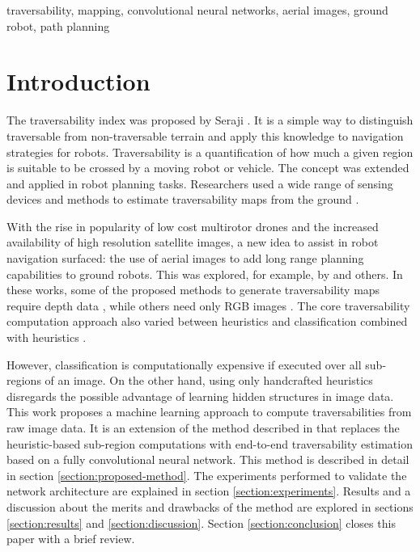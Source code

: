 \documentclass[conference]{IEEEtran}
\begin{document}
\begin{IEEEkeywords}
traversability, mapping, convolutional neural networks, aerial images, ground robot, path planning
\end{IEEEkeywords}

\section{Introduction}

The traversability index was proposed by Seraji \cite{seraji:1999}.
It is a simple way to distinguish traversable from non-traversable terrain and apply this knowledge to navigation strategies for robots.
Traversability is a quantification of how much a given region is suitable to be crossed by a moving robot or vehicle.
The concept was extended and applied in robot planning tasks.
Researchers used a wide range of sensing devices and methods to estimate traversability maps from the ground \cite{howard:2001,howard:2003,castejon:2005,guo:2008,shneier:2008}.

With the rise in popularity of low cost multirotor drones and the increased availability of high resolution satellite images, a new idea to assist in robot navigation surfaced: the use of aerial images to add long range planning capabilities to ground robots.
This was explored, for example, by \cite{vandapel:2006,hudjakov:2011,hudjakov:2013,delmerico:2017,borges:2019} and others.
In these works, some of the proposed methods to generate traversability maps require depth data \cite{vandapel:2006,delmerico:2017}, while others need only RGB images \cite{hudjakov:2011,hudjakov:2013,borges:2019}.
The core traversability computation approach also varied between heuristics \cite{vandapel:2006,borges:2019} and classification combined with heuristics \cite{hudjakov:2011,hudjakov:2013,delmerico:2017}.

However, classification is computationally expensive if executed over all sub-regions of an image.
On the other hand, using only handcrafted heuristics disregards the possible advantage of learning hidden structures in image data.
This work proposes a machine learning approach to compute traversabilities from raw image data.
It is an extension of the method described in \cite{borges:2019} that replaces the heuristic-based sub-region computations with end-to-end traversability estimation based on a fully convolutional neural network.
This method is described in detail in section \ref{section:proposed-method}.
The experiments performed to validate the network architecture are explained in section \ref{section:experiments}.
Results and a discussion about the merits and drawbacks of the method are explored in sections \ref{section:results} and \ref{section:discussion}.
Section \ref{section:conclusion} closes this paper with a brief review.
\end{document}

